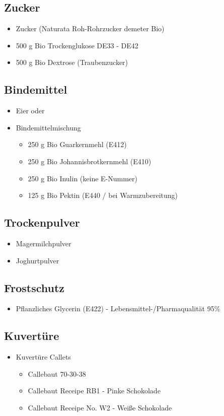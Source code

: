 \documentclass[12pt]{article}
\begin{document}
\subsection{Zucker}
\begin{itemize}
 	\item Zucker (Naturata Roh-Rohrzucker demeter Bio)
  	\item 500 g Bio Trockenglukose DE33 - DE42
   	\item 500 g Bio Dextrose (Traubenzucker)
\end{itemize}

\subsection{Bindemittel}
\begin{itemize}
	\item Eier oder
	\item Bindemittelmischung
	   \begin{itemize}
			\item 250 g Bio Guarkernmehl (E412)
			\item 250 g Bio Johannisbrotkernmehl (E410)
			\item 250 g Bio Inulin (keine E-Nummer)
			\item 125 g Bio Pektin (E440 / bei Warmzubereitung)
		\end{itemize}		
\end{itemize}
\subsection{Trockenpulver}
\begin{itemize}
	\item Magermilchpulver
	\item Joghurtpulver
\end{itemize}


\subsection{Frostschutz}
\begin{itemize}
  	\item Pflanzliches Glycerin (E422) - Lebensmittel-/Pharmaqualität 95\%
\end{itemize}

\subsection{Kuvertüre}
\begin{itemize}
	\item Kuvertüre Callets
	\begin{itemize}
  		\item Callebaut 70-30-38
  		\item Callebaut Receipe RB1 - Pinke Schokolade
  		\item Callebaut Receipe No. W2 - Weiße Schokolade
	\end{itemize}
\end{itemize}
\end{document}
